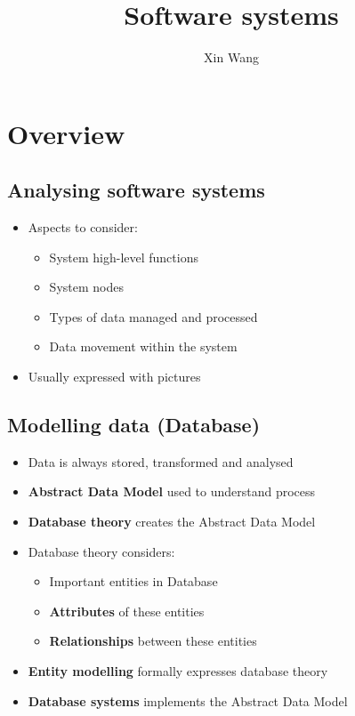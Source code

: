 \documentclass[conference]{IEEEtran}
\begin{document}
\title{Software systems}
\author{Xin Wang}
\maketitle
\section{Overview}
\subsection{Analysing software systems}

\begin{itemize}
    \item Aspects to consider:
    \begin{itemize}
        \item System high-level functions
        \item System nodes
        \item Types of data managed and processed
        \item Data movement within the system
    \end{itemize}

    \item Usually expressed with pictures
\end{itemize}

\subsection{Modelling data (Database)}

\begin{itemize}
    \item Data is always stored, transformed and analysed
    \item \textbf{Abstract Data Model} used to understand process
    \item \textbf{Database theory} creates the Abstract Data Model
    \item Database theory considers:
    \begin{itemize}
        \item Important entities in Database
        \item \textbf{Attributes} of these entities
        \item \textbf{Relationships} between these entities
    \end{itemize}
    \item \textbf{Entity modelling} formally expresses database theory
    \item \textbf{Database systems} implements the Abstract Data Model
\end{itemize}
\end{document}
